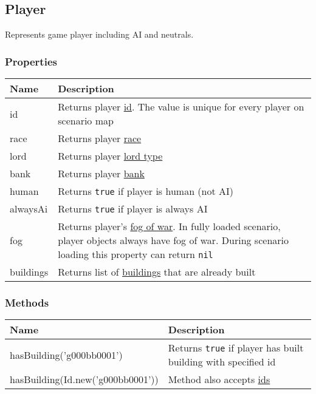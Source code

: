 \subsection{Player}
\label{Player}
Represents game player including AI and neutrals.
\subsubsection{Properties}
\begin{center}
\begin{tabularx}{\linewidth}{| l | X |}
\hline
\textbf{Name} & \textbf{Description} \\
\hline
id & Returns player \hyperref[Id]{id}. The value is unique for every player on scenario map\\
\hline
race & Returns player \hyperref[RaceCategory]{race}\\
\hline
lord & Returns player \hyperref[LordCategory]{lord type}\\
\hline
bank & Returns player \hyperref[Currency]{bank}\\
\hline
human & Returns \texttt{true} if player is human (not AI)\\
\hline
alwaysAi & Returns \texttt{true} if player is always AI\\
\hline
fog & Returns player's \hyperref[Fog]{fog of war}. In fully loaded scenario, player objects always have fog of war. During scenario loading this property can return \texttt{nil}\\
\hline
buildings & Returns list of \hyperref[Building]{buildings} that are already built\\
\hline
\end{tabularx}
\end{center}

\subsubsection{Methods}
\begin{center}
\begin{tabularx}{\linewidth}{| l | X |}
\hline
\textbf{Name} & \textbf{Description} \\
\hline
hasBuilding('g000bb0001') & Returns \texttt{true} if player has built building with specified id\\
hasBuilding(Id.new('g000bb0001')) & Method also accepts \hyperref[Id]{ids}\\
\hline
\end{tabularx}
\end{center}